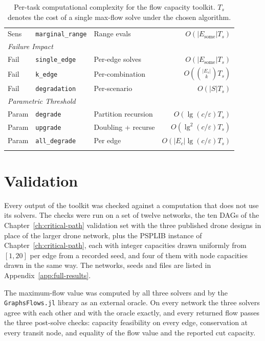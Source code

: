 \documentclass[12pt]{report}
\begin{document}
\begin{longtable}{l l l r}
Sens & \texttt{marginal\_range} & Range evals & $O(|E_{\text{some}}| T_s)$ \\[2pt]
\multicolumn{4}{l}{\small\textit{Failure Impact}} \\
Fail & \texttt{single\_edge} & Per-edge solves & $O(|E_{\text{some}}| T_s)$ \\
Fail & \texttt{k\_edge} & Per-combination & $O(\binom{|E_s|}{k} T_s)$\footnotemark[3] \\
Fail & \texttt{degradation} & Per-scenario & $O(|S| T_s)$ \\[2pt]
\multicolumn{4}{l}{\small\textit{Parametric Threshold}} \\
Param & \texttt{degrade} & Partition recursion & $O(\lg(c/\varepsilon) T_s)$ \\
Param & \texttt{upgrade} & Doubling + recurse & $O(\lg^2(c/\varepsilon) T_s)$ \\
Param & \texttt{all\_degrade} & Per edge & $O(|E_c| \lg(c/\varepsilon) T_s)$ \\[2pt]
\caption{Per-task computational complexity for the flow capacity toolkit. $T_s$ denotes the cost of a single max-flow solve under the chosen algorithm.}
\label{tab:flowcap_complexity}
\end{longtable}




\section{Validation}
\label{sec:flow-validation}

Every output of the toolkit was checked against a computation that does not use its solvers.
The checks were run on a set of twelve networks, the ten DAGs of the Chapter~\ref{ch:critical-path}
validation set with the three published drone designs in place of the larger drone network,
plus the PSPLIB instance of Chapter~\ref{ch:critical-path}, each with integer capacities drawn
uniformly from $[1, 20]$ per edge from a recorded seed, and four of them with node capacities
drawn in the same way. The networks, seeds and files are listed in
Appendix~\ref{app:full-results}.

The maximum-flow value was computed by all three solvers and by the \texttt{GraphsFlows.jl}
library \cite{graphsflows} as an external oracle. On every network the three solvers agree
with each other and with the oracle exactly, and every returned flow passes the three
post-solve checks: capacity feasibility on every edge, conservation at every transit node, and
equality of the flow value and the reported cut capacity.
\end{document}

